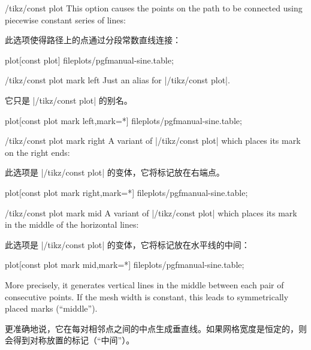 \begin{key}{/tikz/const plot}
    This option causes the points on the path to be connected using piecewise
    constant series of lines:
    
    此选项使得路径上的点通过分段常数直线连接：


\begin{codeexample}[]
\tikz\draw plot[const plot] file{plots/pgfmanual-sine.table};
\end{codeexample}
\end{key}

\begin{key}{/tikz/const plot mark left}
    Just an alias for |/tikz/const plot|.
    
    它只是 |/tikz/const plot| 的别名。


\begin{codeexample}[]
\tikz\draw plot[const plot mark left,mark=*] file{plots/pgfmanual-sine.table};
\end{codeexample}
\end{key}

\begin{key}{/tikz/const plot mark right}
    A variant of |/tikz/const plot| which places its mark on the right ends:
    
    此选项是 |/tikz/const plot| 的变体，它将标记放在右端点。


\begin{codeexample}[]
\tikz\draw plot[const plot mark right,mark=*] file{plots/pgfmanual-sine.table};
\end{codeexample}
\end{key}

\begin{key}{/tikz/const plot mark mid}
    A variant of |/tikz/const plot| which places its mark in the middle of the
    horizontal lines:
    
    此选项是 |/tikz/const plot| 的变体，它将标记放在水平线的中间：
\begin{codeexample}[]
\tikz\draw plot[const plot mark mid,mark=*] file{plots/pgfmanual-sine.table};
\end{codeexample}
    More precisely, it generates vertical lines in the middle between each pair
    of consecutive points. If the mesh width is constant, this leads to
    symmetrically placed marks (``middle'').

    更准确地说，它在每对相邻点之间的中点生成垂直线。如果网格宽度是恒定的，则会得到对称放置的标记（“中间”）。
\end{key}

